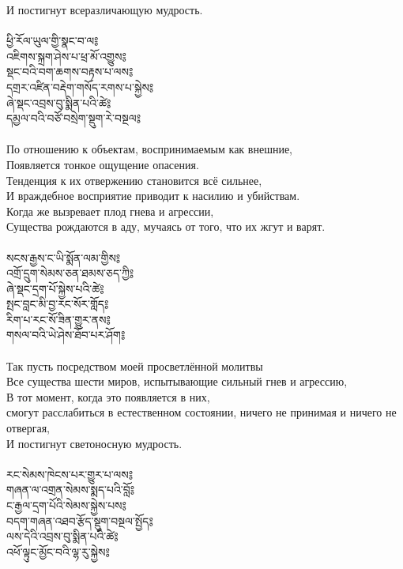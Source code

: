 И постигнут всеразличающую мудрость.\\
\\
\newpage
{\ti
ཕྱི་རོལ་ཡུལ་གྱི་སྣང་བ་ལ༔ \\
འཇིགས་སྐྲག་ཤེས་པ་ཕྲ་མོ་འགྱུས༔ \\
སྡང་བའི་བག་ཆགས་བརྟས་པ་ལས༔ \\
དགྲར་འཛིན་བརྡེག་གསོད་རགས་པ་སྐྱེས༔ \\
ཞེ་སྡང་འབྲས་བུ་སྨིན་པའི་ཚེ༔ \\
དམྱལ་བའི་བཙོ་བསྲེག་སྡུག་རེ་བསྔལ༔}\\
\\
По отношению к объектам, воспринимаемым как внешние, \\
Появляется тонкое ощущение опасения. \\
Тенденция к их отвержению становится всё сильнее, \\
И враждебное восприятие приводит к насилию и убийствам. \\
Когда же вызревает плод гнева и агрессии, \\
Существа рождаются в аду, мучаясь от того, что их жгут и варят.\\
\\
{\ti
སངས་རྒྱས་ང་ཡི་སྨོན་ལམ་གྱིས༔ \\
འགྲོ་དྲུག་སེམས་ཅན་ཐམས་ཅད་ཀྱི༔ \\
ཞེ་སྡང་དྲག་པོ་སྐྱེས་པའི་ཚེ༔ \\
སྤང་བླང་མི་བྱ་རང་སོར་གློད༔ \\
རིག་པ་རང་སོ་ཟིན་གྱུར་ནས༔ \\
གསལ་བའི་ཡེ་ཤེས་ཐོབ་པར་ཤོག༔}\\
\\
Так пусть посредством моей просветлённой молитвы\\
Все существа шести миров, испытывающие сильный гнев и агрессию,\\
В тот момент, когда это появляется в них,\\
смогут расслабиться в естественном состоянии, ничего не принимая и ничего не отвергая,\\
И постигнут светоносную мудрость.\\
\\
\newpage
{\ti
རང་སེམས་ཁེངས་པར་གྱུར་པ་ལས༔ \\
གཞན་ལ་འགྲན་སེམས་སྨད་པའི་བློ༔ \\
ང་རྒྱལ་དྲག་པོའི་སེམས་སྐྱེས་པས༔ \\
བདག་གཞན་འཐབ་རྩོད་སྡུག་བསྔལ་སྤྱོད༔ \\
ལས་དེའི་འབྲས་བུ་སྨིན་པའི་ཚེ༔ \\
འཕོ་ལྟུང་མྱོང་བའི་ལྷ་རུ་སྐྱེས༔}\\
\\

